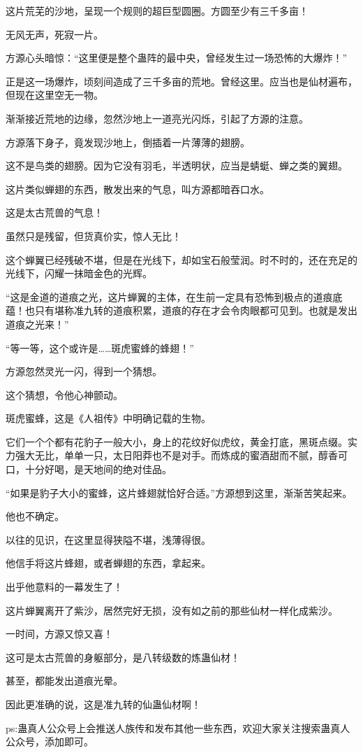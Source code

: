 \begin{this_body}
这片荒芜的沙地，呈现一个规则的超巨型圆圈。方圆至少有三千多亩！

无风无声，死寂一片。

方源心头暗惊：“这里便是整个蛊阵的最中央，曾经发生过一场恐怖的大爆炸！”

正是这一场爆炸，顷刻间造成了三千多亩的荒地。曾经这里。应当也是仙材遍布，但现在这里空无一物。

渐渐接近荒地的边缘，忽然沙地上一道亮光闪烁，引起了方源的注意。

方源落下身子，竟发现沙地上，倒插着一片薄薄的翅膀。

这不是鸟类的翅膀。因为它没有羽毛，半透明状，应当是蜻蜓、蝉之类的翼翅。

这片类似蝉翅的东西，散发出来的气息，叫方源都暗吞口水。

这是太古荒兽的气息！

虽然只是残留，但货真价实，惊人无比！

这个蝉翼已经残破不堪，但是在光线下，却如宝石般莹润。时不时的，还在充足的光线下，闪耀一抹暗金色的光辉。

“这是金道的道痕之光，这片蝉翼的主体，在生前一定具有恐怖到极点的道痕底蕴！也只有堪称准九转的道痕积累，道痕的存在才会令肉眼都可见到。也就是发出道痕之光来！”

“等一等，这个或许是……斑虎蜜蜂的蜂翅！”

方源忽然灵光一闪，得到一个猜想。

这个猜想，令他心神颤动。

斑虎蜜蜂，这是《人祖传》中明确记载的生物。

它们一个个都有花豹子一般大小，身上的花纹好似虎纹，黄金打底，黑斑点缀。实力强大无比，单单一只，太日阳莽也不是对手。而炼成的蜜酒甜而不腻，醇香可口，十分好喝，是天地间的绝对佳品。

“如果是豹子大小的蜜蜂，这片蜂翅就恰好合适。”方源想到这里，渐渐苦笑起来。

他也不确定。

以往的见识，在这里显得狭隘不堪，浅薄得很。

他信手将这片蜂翅，或者蝉翅的东西，拿起来。

出乎他意料的一幕发生了！

这片蝉翼离开了紫沙，居然完好无损，没有如之前的那些仙材一样化成紫沙。

一时间，方源又惊又喜！

这可是太古荒兽的身躯部分，是八转级数的炼蛊仙材！

甚至，都能发出道痕光晕。

因此更准确的说，这是准九转的仙蛊仙材啊！

ps:蛊真人公众号上会推送人族传和发布其他一些东西，欢迎大家关注搜索蛊真人公众号，添加即可。

\end{this_body}

